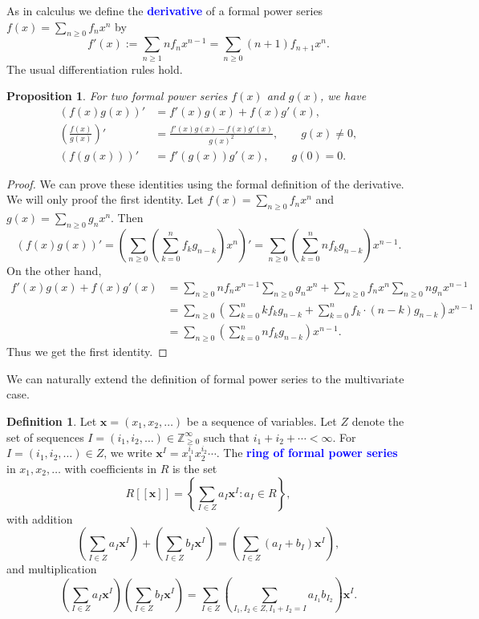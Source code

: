 \documentclass[oneside]{book}
\numberwithin{equation}{section}
\newtheorem{prop}[thm]{Proposition}
\theoremstyle{definition}
\newtheorem{defn}[thm]{Definition}
\newcommand{\ZZ}{\mathbb{Z}}
\renewcommand\vec[1]{\bm{#1}}
\newcommand\vx{\vec{x}}
\renewcommand\emph[1]{\textcolor{blue}{\bf #1}}
\begin{document}
As in calculus we define the \emph{derivative} of a formal power
series \( f(x) = \sum_{n\ge0} f_n x^n \) by
\[
  f'(x) := \sum_{n\ge1} n f_n x^{n-1} = \sum_{n\ge0} (n+1) f_{n+1} x^{n}.
\]
The usual differentiation rules hold.
\begin{prop}
  For two formal power series \( f(x) \) and \( g(x) \),
  we have
\begin{align*}
  (f(x)g(x))'
  &= f'(x) g(x) + f(x) g'(x), \\
  \left(\frac{f(x)}{g(x)}\right)'
  &= \frac{f'(x) g(x) - f(x) g'(x)}{g(x)^2}, \qquad g(x) \ne 0,\\
  (f(g(x)))'
  &= f'(g(x)) g'(x), \qquad g(0) = 0.
\end{align*}
\end{prop}

\begin{proof}
  We can prove these identities using the formal definition of the
  derivative. We will only proof the first identity. Let
  \( f(x) = \sum_{n\ge0} f_n x^n \) and
  \( g(x) = \sum_{n\ge0} g_n x^n \). Then
  \[
    (f(x)g(x))' = \left( \sum_{n\ge 0} \left( \sum_{k=0}^{n} f_kg_{n-k} \right) x^{n} \right)'
      = \sum_{n\ge 0} \left( \sum_{k=0}^{n} n f_kg_{n-k}
    \right) x^{n-1}.
  \]
  On the other hand,
  \begin{align*}
    f'(x) g(x) + f(x) g'(x)
    & =  \sum_{n\ge0} n f_n x^{n-1} \sum_{n\ge0} g_n x^n +   
      \sum_{n\ge0} f_n x^n \sum_{n\ge0} n g_n x^{n-1}\\
    &= \sum_{n\ge 0} \left( \sum_{k=0}^{n} kf_kg_{n-k}
      + \sum_{k=0}^{n} f_k\cdot (n-k)g_{n-k} \right) x^{n-1}\\
    &= \sum_{n\ge 0} \left( \sum_{k=0}^{n} nf_kg_{n-k} \right) x^{n-1}.
  \end{align*}
  Thus we get the first identity.
\end{proof}





We can naturally extend the definition of formal power series to the
multivariate case.


\begin{defn}
  Let \( \vx =(x_1,x_2,\dots) \) be a sequence of variables. Let
  \( Z \) denote the set of sequences
  \( I=(i_1,i_2,\dots)\in \ZZ_{\ge0}^\infty \) such that
  \( i_1+i_2 + \cdots < \infty \). For \( I=(i_1,i_2,\dots)\in Z \),
  we write \( \vx^I = x_1^{i_1} x_2^{i_2} \cdots \). The \emph{ring of
    formal power series} in \( x_1,x_2,\dots \) with coefficients in
  \( R \) is the set
\[
  R[[\vx]] = \left\{ \sum_{I\in Z} a_I \vx^I  : a_I\in R \right\},
\]
with addition
\[
  \left(\sum_{I\in Z} a_I \vx^I \right) + \left(\sum_{I\in Z} b_I \vx^I
  \right) = \left( \sum_{I\in Z} (a_I+b_I) \vx^I \right),
\]
and multiplication
\[
  \left(\sum_{I\in Z} a_I \vx^I \right) \left(\sum_{I\in Z} b_I \vx^I
  \right) = \sum_{I\in Z} \left( \sum_{I_1,I_2\in Z, I_1+I_2=I} a_{I_1} b_{I_2} \right) \vx^I.
\]
\end{defn}
\end{document}
